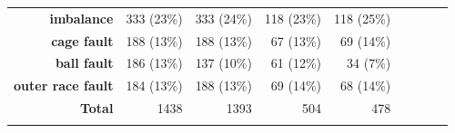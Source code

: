 \begin{table}[ht]
\begin{tabular}{rrrrrllll}
\multicolumn{1}{|r|}{\textbf{imbalance}}              & \multicolumn{1}{r|}{333 (23\%)}                 & \multicolumn{1}{r|}{333 (24\%)}                 & \multicolumn{1}{r|}{118 (23\%)}                            & \multicolumn{1}{r|}{118 (25\%)}                           &                               &                               &                               &                               \\ \cline{1-5}
\multicolumn{1}{|r|}{\textbf{cage fault}}             & \multicolumn{1}{r|}{188 (13\%)}                 & \multicolumn{1}{r|}{188 (13\%)}                 & \multicolumn{1}{r|}{67 (13\%)}                             & \multicolumn{1}{r|}{69 (14\%)}                            &                               &                               &                               &                               \\ \cline{1-5}
\multicolumn{1}{|r|}{\textbf{ball fault}}             & \multicolumn{1}{r|}{186 (13\%)}                 & \multicolumn{1}{r|}{137 (10\%)}                 & \multicolumn{1}{r|}{61 (12\%)}                             & \multicolumn{1}{r|}{34 (7\%)}                             &                               &                               &                               &                               \\ \cline{1-5}
\multicolumn{1}{|r|}{\textbf{outer race fault}}       & \multicolumn{1}{r|}{184 (13\%)}                 & \multicolumn{1}{r|}{188 (13\%)}                 & \multicolumn{1}{r|}{69 (14\%)}                             & \multicolumn{1}{r|}{68 (14\%)}                            &                               &                               &                               &                               \\ \cline{1-5}
\multicolumn{1}{|r|}{\textbf{Total}}                  & \multicolumn{1}{r|}{1438}                       & \multicolumn{1}{r|}{1393}                       & \multicolumn{1}{r|}{504}                                   & \multicolumn{1}{r|}{478}                                  & \multicolumn{1}{r}{\textbf{}} & \multicolumn{1}{r}{\textbf{}} & \multicolumn{1}{r}{\textbf{}} & \multicolumn{1}{r}{\textbf{}} \\ \cline{1-5}
\textbf{}                                             &                                                 &                                                 &                                                            &                                                           & \multicolumn{1}{r}{}          & \multicolumn{1}{r}{}          & \multicolumn{1}{r}{}          & \multicolumn{1}{r}{}          \\

\end{tabular}
\end{table}
